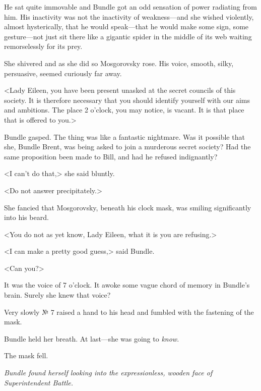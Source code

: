 He sat quite immovable and Bundle got an odd sensation of power radiating from him. His inactivity was not the inactivity of weakness—and she wished violently, almost hysterically, that he would speak—that he would make some sign, some gesture—not just sit there like a gigantic spider in the middle of its web waiting remorselessly for its prey.

She shivered and as she did so Mosgorovsky rose. His voice, smooth, silky, persuasive, seemed curiously far away.

<Lady Eileen, you have been present unasked at the secret councils of this society. It is therefore necessary that you should identify yourself with our aims and ambitions. The place 2 o'clock, you may notice, is vacant. It is that place that is offered to you.>

Bundle gasped. The thing was like a fantastic nightmare. Was it possible that she, Bundle Brent, was being asked to join a murderous secret society? Had the same proposition been made to Bill, and had he refused indignantly?

<I can't do that,> she said bluntly.

<Do not answer precipitately.>

She fancied that Mosgorovsky, beneath his clock mask, was smiling significantly into his beard.

<You do not as yet know, Lady Eileen, what it is you are refusing.>

<I can make a pretty good guess,> said Bundle.

<Can you?>

It was the voice of 7 o'clock. It awoke some vague chord of memory in Bundle's brain. Surely she knew that voice?

Very slowly № 7 raised a hand to his head and fumbled with the fastening of the mask.

Bundle held her breath. At last—she was going to \emph{know}.

The mask fell.

\emph{Bundle found herself looking into the expressionless, wooden face of Superintendent Battle.}